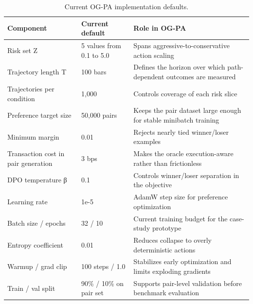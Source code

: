 \begin{table}[t]
\centering
\caption{Current OG-PA implementation defaults.}
\label{tab:table_33_ogpa_defaults}
\begin{tabular}{lll}
\toprule
Component & Current default & Role in OG-PA \\
\midrule
Risk set Z & 5 values from 0.1 to 5.0 & Spans aggressive-to-conservative action scaling \\
Trajectory length T & 100 bars & Defines the horizon over which path-dependent outcomes are measured \\
Trajectories per condition & 1,000 & Controls coverage of each risk slice \\
Preference target size & 50,000 pairs & Keeps the pair dataset large enough for stable minibatch training \\
Minimum margin & 0.01 & Rejects nearly tied winner/loser examples \\
Transaction cost in pair generation & 3 bps & Makes the oracle execution-aware rather than frictionless \\
DPO temperature β & 0.1 & Controls winner/loser separation in the objective \\
Learning rate & 1e-5 & AdamW step size for preference optimization \\
Batch size / epochs & 32 / 10 & Current training budget for the case-study prototype \\
Entropy coefficient & 0.01 & Reduces collapse to overly deterministic actions \\
Warmup / grad clip & 100 steps / 1.0 & Stabilizes early optimization and limits exploding gradients \\
Train / val split & 90\% / 10\% on pair set & Supports pair-level validation before benchmark evaluation \\
\bottomrule
\end{tabular}
\end{table}
